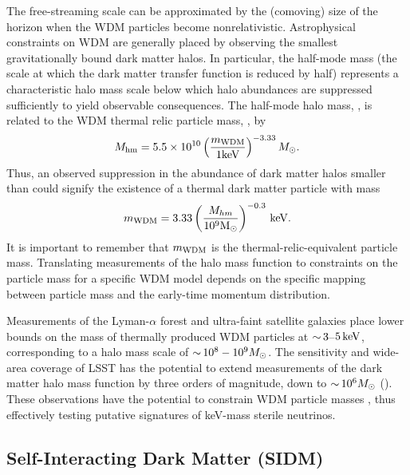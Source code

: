 The free-streaming scale can be approximated by the (comoving) size of the horizon when the WDM particles become nonrelativistic.
Astrophysical constraints on WDM are generally placed by observing the smallest gravitationally bound dark matter halos.  
In particular, the half-mode mass (the scale at which the dark matter transfer function is reduced by half) represents a characteristic halo mass scale below which halo abundances are suppressed sufficiently to yield observable consequences. 
The half-mode halo mass, \Mhm, is related to the WDM thermal relic particle mass, \mWDM, by \citep[\eg][]{schneider2012,Bullock:2017}
\begin{equation} \label{eqn:Mhm}
    M_{\rm hm} = 5.5 \times 10^{10} \left( \frac{m_{\rm WDM}}{1 {\rm keV}} \right)^{-3.33} M_\odot.
\end{equation}
Thus, an observed suppression in the abundance of dark matter halos smaller than \Mhm could signify the existence of a thermal dark matter particle with mass
\begin{equation} \label{eqn:mWDM}
    m_{\rm WDM} =  3.33 \left(\frac{M_{hm}}{10^{9} {\rm M_\odot}} \right)^{-0.3} \mathrm{\,keV}.
\end{equation}
It is important to remember that $m_{\rm WDM}$ is the thermal-relic-equivalent particle mass. Translating measurements of the halo mass function to constraints on the particle mass for a specific WDM model depends on the specific mapping between particle mass and the early-time momentum distribution.

Measurements of the Lyman-$\alpha$ forest \citep[\eg][]{Viel:2013,2017PhRvD..96b3522I} and ultra-faint satellite galaxies \citep[\eg][]{Jethwa:2018,Kim:2017iwr} place lower bounds on the mass of thermally produced WDM particles at $ {\sim}\, 3$--$5\mathrm{\,keV}$, corresponding to a halo mass scale of $ {\sim}\, 10^8-10^9 M_\odot$.
The sensitivity and wide-area coverage of LSST has the potential to extend measurements of the dark matter halo mass function by three orders of magnitude, down to $ {\sim}\, 10^6 M_\odot$ (). 
These observations have the potential to constrain WDM particle masses \CHECK{$\mWDM \gtrsim 18\keV$}, thus effectively testing putative signatures of keV-mass sterile neutrinos.


\subsection{Self-Interacting Dark Matter (SIDM)}
\label{sec:sidm}

